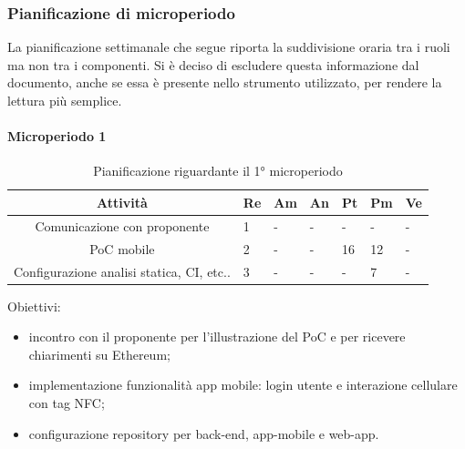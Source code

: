 \subsubsection{Pianificazione di microperiodo}
\indent La pianificazione settimanale che segue riporta la suddivisione oraria tra i ruoli ma non tra i componenti. Si è deciso di escludere questa informazione dal documento, anche se essa è presente nello strumento utilizzato, per rendere la lettura più semplice.

\paragraph{Microperiodo 1}
\begin{table}[H]
	\centering
	\renewcommand{\arraystretch}{1.5}
	\begin{tabular}{|c|p{10mm}|p{10mm}|p{10mm}|p{10mm}|p{10mm}|p{10mm}|}
		\hline
		\rowcolor{lighter-grayer}
		\textbf{Attività}                         & \textbf{Re} & \textbf{Am} & \textbf{An} & \textbf{Pt} & \textbf{Pm} & \textbf{Ve} \\ \hline
		Comunicazione con proponente              & 1           & -           & -           & -           & -           & -           \\ \hline
		PoC mobile                                & 2           & -           & -           & 16          & 12          & -           \\ \hline
		Configurazione analisi statica, CI, etc.. & 3           & -           & -           & -           & 7           & -           \\ \hline 
	\end{tabular}
	\caption{ Pianificazione riguardante il 1° microperiodo\\}
\end{table}

Obiettivi:
\begin{itemize}
	\item incontro con il proponente per l'illustrazione del PoC e per ricevere chiarimenti su Ethereum;
	\item implementazione funzionalità app mobile: login utente e interazione cellulare con tag NFC;
	\item configurazione repository per back-end, app-mobile e web-app.
\end{itemize}

